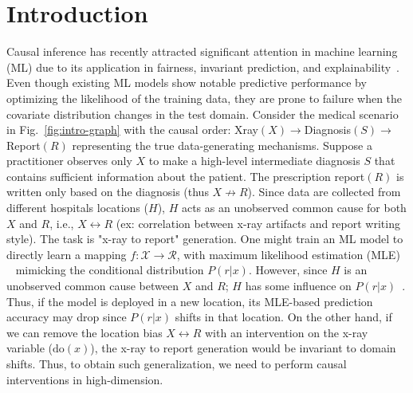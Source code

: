\documentclass{article}
\newcommand{\Do}{\text{do}}
\theoremstyle{plain}
\theoremstyle{definition}
\theoremstyle{remark}
\begin{document}
\section{Introduction}
\label{sec:introduction}
%
%
\par
Causal inference has recently attracted significant attention in machine learning (ML) due to its application in 
fairness, invariant prediction, and explainability~\citep{xin2022vision,zhang2020causal,subbaswamy2021evaluating}.
Even though existing ML models show notable predictive performance by optimizing the likelihood of the training data, they are prone to failure when the covariate distribution changes in the test domain. 
%
Consider the medical scenario in Fig.~\ref{fig:intro-graph} with the causal order: Xray$(X)$$\rightarrow$Diagnosis$(S)$$\rightarrow$Report$(R)$ representing the true data-generating mechanisms. 
Suppose a practitioner observes only $X$ to make a high-level intermediate diagnosis $S$ that contains sufficient information about the patient. The prescription report$(R)$ is written only based on the diagnosis (thus $X \not\rightarrow R$).
Since data are collected from different hospitals locations ($H$), $H$ acts as an unobserved common cause for both $X$ and $R$, i.e., $X\leftrightarrow R$ (ex: correlation between x-ray artifacts and report writing style).
The task is "x-ray to report" generation. One might train an ML model to directly learn a mapping $f: \mathcal{X}\rightarrow \mathcal{R}$, with maximum likelihood estimation (MLE) ~\citep{boecking2022making,chambon2022roentgen} mimicking the conditional distribution $P(r|x)$.
However, since $H$ is an unobserved common cause between $X$ and $R$; $H$ has some influence on $P(r|x)$~\citep{catala2021bias}. 
Thus, if the model is deployed in a new location, its MLE-based prediction accuracy may drop since $P(r|x)$ shifts in that location.
%
%
On the other hand, if we can remove the location bias $X\leftrightarrow R$ with an intervention on the x-ray variable ($\Do(x)$), the  x-ray to report generation would be invariant to domain shifts.
%
Thus, to obtain such generalization, we need to perform causal interventions in high-dimension.
%
%
\end{document}
